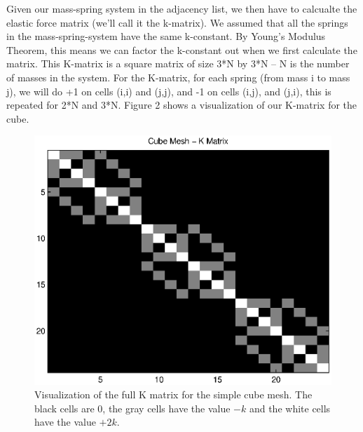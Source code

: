 \documentclass{article}
\begin{document}
Given our mass-spring system in the adjacency list, we then have to calcualte the elastic force matrix (we'll call it the k-matrix). We assumed that all the springs in the mass-spring-system have the same k-constant. By Young's Modulus Theorem, this means we can factor the k-constant out when we first calculate the matrix. This K-matrix is a square matrix of size 3*N by 3*N -- N is the number of masses in the system. For the K-matrix, for each spring (from mass i to mass j), we will do +1 on cells  (i,i) and (j,j), and -1 on cells (i,j), and (j,i), this is repeated for 2*N and 3*N. Figure 2 shows a visualization of our K-matrix for the cube. 

  \begin{figure}[H]
    \begin{center}
        \includegraphics[width=0.8\columnwidth]{cube_mesh_Kmatrix} 
    \end{center} 
    \caption{Visualization of the full K matrix for the simple cube mesh. The
              black cells are $0$, the gray cells have the value $-k$ and the white
              cells have the value $+2k$.}
  \end{figure}
\end{document}
